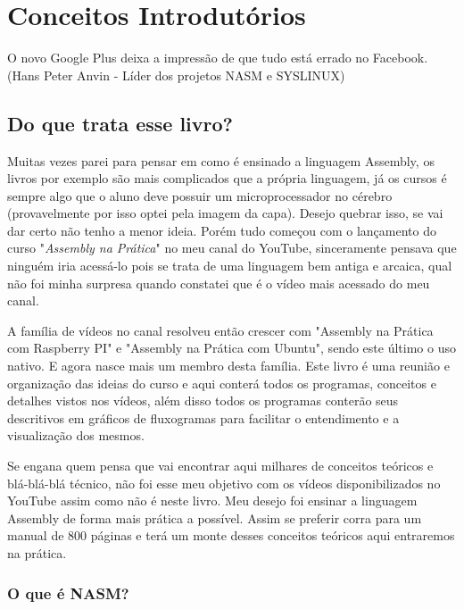 \chapter{Conceitos Introdutórios}
\begin{remark}
O novo Google Plus deixa a impressão de que tudo está errado no Facebook. (Hans Peter Anvin - Líder dos projetos NASM e SYSLINUX) 
\end{remark}

\section{Do que trata esse livro?}

Muitas vezes parei para pensar em como é ensinado a linguagem Assembly, os livros por exemplo são mais complicados que a própria linguagem, já os cursos é sempre algo que o aluno deve possuir um microprocessador no cérebro (provavelmente por isso optei pela imagem da capa). Desejo quebrar isso, se vai dar certo não tenho a menor ideia. Porém tudo começou com o lançamento do curso "\textit{Assembly na Prática}" no meu canal do YouTube, sinceramente pensava que ninguém iria acessá-lo pois se trata de uma linguagem bem antiga e arcaica, qual não foi minha surpresa quando constatei que é o vídeo mais acessado do meu canal.

A família de vídeos no canal resolveu então crescer com "Assembly na Prática com Raspberry PI" e "Assembly na Prática com Ubuntu", sendo este último o uso nativo. E agora nasce mais um membro desta família. Este livro é uma reunião e organização das ideias do curso e aqui conterá todos os programas, conceitos e detalhes vistos nos vídeos, além disso todos os programas conterão seus descritivos em gráficos de fluxogramas para facilitar o entendimento e a visualização dos mesmos.

Se engana quem pensa que vai encontrar aqui milhares de conceitos teóricos e blá-blá-blá técnico, não foi esse meu objetivo com os vídeos disponibilizados no YouTube assim como não é neste livro. Meu desejo foi ensinar a linguagem Assembly de forma mais prática a possível. Assim se preferir corra para um manual de 800 páginas e terá um monte desses conceitos teóricos aqui entraremos na prática.

\subsection{O que é NASM?}


